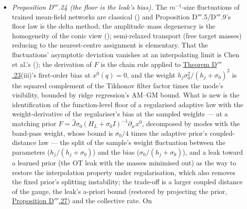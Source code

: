 \begin{itemize}
    stationary point. The limits of the bias removal are largely the precedents' own properties --- the lost a-priori
    bound is the proximal point method's behaviour without a minimiser (\cite{S49}), the $K_0$-cluster bias the
    quantisation error of soft weight-sharing's hard limit --- and specific here only in their particle,
    mass-constrained form and in the run-off from a fit that the network attains exactly. Numerics:
    . Verdict: standard ingredients and per-mode formulas (proximal point and iterated
    Tikhonov, elastic averaging, soft weight-sharing), a new mechanism (their transfer to the mass-constrained particle
    system, uniform in $m$) and a new failure mode with its remedy (the transit's drag and the gate).
  \item \emph{Proposition D$'''$.24 (the floor is the leak's bias).} The $m^{-1}$-size fluctuations of trained
    mean-field networks are classical (\cite{R30,S51}) and Proposition D$'''$.5/D$'''$.9's floor law is the delta
    method; the amplitude--mass degeneracy is the homogeneity of the conic view (\cite{R49,R55}); semi-relaxed
    transport (free target masses) reducing to the nearest-centre assignment is elementary. That the fluctuations'
    asymptotic deviation vanishes at an interpolating limit is Chen et al.'s (\cite{S51}); the derivation of $F$ is
    the chain rule applied to \hyperref[res:thmDppp:23]{Theorem D$'''$.23}(iii)'s first-order bias at $x^0(q) = 0$,
    and the weight $h_j\sigma_0^2/(h_j + \sigma_0)^2$ is the squared complement of the Tikhonov filter factor times
    the mode's visibility, bounded by ridge regression's AM--GM bound. What is new is the identification of the
    function-level floor of a regularised adaptive law with the weight-derivative of the regulariser's bias at the
    sampled weights --- at a matching prior $F = \hat J\sigma_0(H_L + \sigma_0I)^{-1}\partial_wx^0$, decomposed by
    modes with the band-pass weight, whose bound is $\sigma_0/4$ times the adaptive prior's coupled-distance law ---
    the split of the sample's weight fluctuation between the parameters ($h_j/(h_j + \sigma_0)$) and the bias
    ($\sigma_0/(h_j + \sigma_0)$), and a leak toward a learned prior (the OT leak with the masses minimised out) as
    the way to restore the interpolation property under regularisation, which also removes the fixed prior's
    splitting instability; the trade-off is a larger coupled distance of the gauge, the leak's a-priori bound
    (restored by projecting the prior, \hyperref[res:thmDppp:27]{Proposition D$'''$.27}) and the collective rate. On

\end{itemize}
